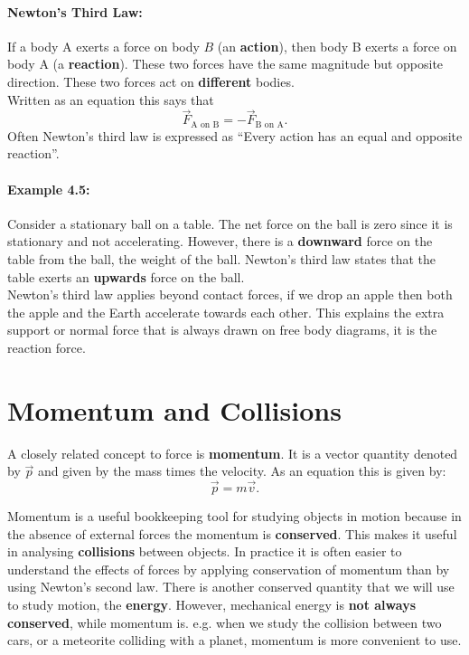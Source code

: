\documentclass[a4paper,12pt]{book}
\begin{document}
\paragraph{Newton's Third Law:} If a body A exerts a force on body $B$ (an \textbf{action}), then body B exerts a force on body A (a \textbf{reaction}). These two forces have the same magnitude but opposite direction. These two forces act on \textbf{different} bodies.\\

Written as an equation this says that
\begin{equation*}
\vec{F}_{\text{A on B}}=-\vec{F}_{\text{B on A}}.
\end{equation*}
Often Newton's third law is expressed as ``Every action has an equal and opposite reaction''.

\paragraph{Example 4.5:} Consider a stationary ball on a table. The net force on the ball is zero since it is stationary and not accelerating. However, there is a \textbf{downward} force on the table from the ball, the weight of the ball. Newton's third law states that the table exerts an \textbf{upwards} force on the ball.\\

Newton's third law applies beyond contact forces, if we drop an apple then both the apple and the Earth accelerate towards each other. This explains the extra support or normal force that is always drawn on free body diagrams, it is the reaction force.\\


\section{Momentum and Collisions}
A closely related concept to force is \textbf{momentum}. It is a vector quantity denoted by $\vec{p}$ and given by the mass times the velocity. As an equation this is given by:
\begin{equation*}
\vec{p}=m\vec{v}.
\label{eq: momentum}
\end{equation*}

Momentum is a useful bookkeeping tool for studying objects in motion because in the absence of external forces the momentum is \textbf{conserved}. This makes it useful in analysing \textbf{collisions} between objects. In practice it is often easier to understand the effects of forces by applying conservation of momentum than by using Newton's second law. There is another conserved quantity that we will use to study motion, the \textbf{energy}. However, mechanical energy is \textbf{not always conserved}, while momentum is. e.g. when we study the collision between two cars, or a meteorite colliding with a planet, momentum is more convenient to use.\\
\end{document}
